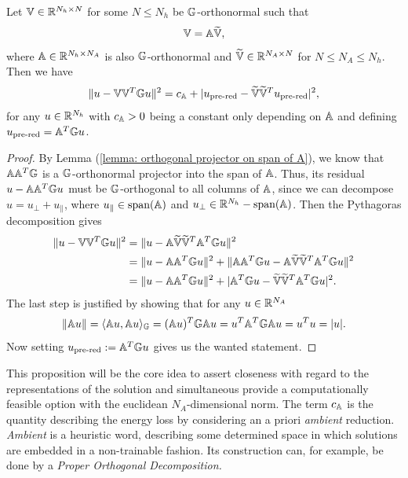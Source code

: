 \begin{proposition} \label{prop: switch to euclidean norm}
    Let $\mathbb{V} \in \mathbb{R}^{N_h \times N}$ 
    for some $N \leq N_h$ be
    $\mathbb{G}$-orthonormal such that
    \begin{equation*}
        \mathbb{V} = \mathbb{A} \widetilde{\mathbb{V}},
    \end{equation*}
    where $\mathbb{A} \in \mathbb{R}^{N_h \times N_A}$
    is also $\mathbb{G}$-orthonormal and $\widetilde{\mathbb{V}} \in \mathbb{R}^{N_A \times N}$ for $N \leq N_A \leq N_h$. 
    Then we have
    \begin{equation*}
        \lVert u - \mathbb{V} \mathbb{V}^T \mathbb{G} u \rVert^2 = c_{\mathbb{A}} + \lvert u_\text{pre-red} - \widetilde{\mathbb{V}} \widetilde{\mathbb{V}}^T u_\text{pre-red} \rvert^2,
    \end{equation*}
    for any 
    $u \in \mathbb{R}^{N_h}$ with $c_{\mathbb{A}} > 0$ being a constant only depending on $\mathbb{A}$ and defining $u_\text{pre-red} = \mathbb{A}^T \mathbb{G} u$.
\end{proposition}
\begin{proof}
    By Lemma (\ref{lemma: orthogonal projector on span of A}), we know that $\mathbb{A} \mathbb{A}^T \mathbb{G}$ is a $\mathbb{G}$-orthonormal 
    projector into the span of $\mathbb{A}$. Thus, its residual $u - \mathbb{A} \mathbb{A}^T \mathbb{G} u$ must be 
    $\mathbb{G}$-orthogonal to all columns of $\mathbb{A}$, since we can decompose 
    $u = u_\perp + u_\parallel$, where $u_\parallel \in \text{span}(\mathbb{A})$ and 
    $u_\perp \in \mathbb{R}^{N_h} - \text{span}(\mathbb{A})$. Then the Pythagoras decomposition gives
    \begin{align*}
        \lVert u - \mathbb{V} \mathbb{V}^T \mathbb{G} u \rVert^2 &= \lVert u - \mathbb{A} \widetilde{\mathbb{V}} \widetilde{\mathbb{V}}^T \mathbb{A}^T \mathbb{G} u \rVert^2 \\
        &= \lVert u - \mathbb{A} \mathbb{A}^T \mathbb{G} u \rVert^2 + \lVert \mathbb{A} \mathbb{A}^T \mathbb{G} u - \mathbb{A} \widetilde{\mathbb{V}} \widetilde{\mathbb{V}}^T \mathbb{A}^T \mathbb{G} u \rVert^2 \\
        &= \lVert u - \mathbb{A} \mathbb{A}^T \mathbb{G} u \rVert^2 + \lvert \mathbb{A}^T \mathbb{G} u - \widetilde{\mathbb{V}} \widetilde{\mathbb{V}}^T \mathbb{A}^T \mathbb{G} u \rvert^2.
    \end{align*}
    The last step is justified by showing that for any $u \in \mathbb{R}^{N_A}$
    \begin{equation*}
        \lVert \mathbb{A} u \rVert = \langle \mathbb{A} u, \mathbb{A} u \rangle_{\mathbb{G}} = (\mathbb{A} u)^T \mathbb{G} \mathbb{A} u = u^T \mathbb{A}^T \mathbb{G} \mathbb{A} u = u^T u = \lvert u \rvert.
    \end{equation*}
    Now setting $u_\text{pre-red} := \mathbb{A}^T \mathbb{G} u$ gives us the wanted statement.
\end{proof}

This proposition will be the core idea to
assert closeness with regard to the representations of the solution and
simultaneous provide a computationally
feasible option with the euclidean $N_A$-dimensional
norm. The term $c_{\mathbb{A}}$ is the quantity describing the energy loss by considering an a priori
\emph{ambient} reduction. \emph{Ambient} is a heuristic word, describing some determined space in which solutions
are embedded in a non-trainable fashion. Its construction can, for example, be done by a \emph{Proper Orthogonal Decomposition.}


